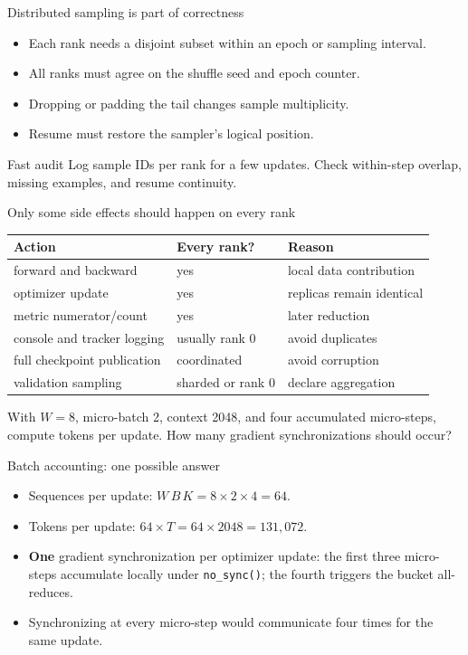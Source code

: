 \documentclass[handout]{beamer}
\begin{document}
\begin{frame}{Distributed sampling is part of correctness}
  \begin{itemize}
      \setlength{\itemsep}{8pt}
    \item Each rank needs a disjoint subset within an epoch or sampling interval.
    \item All ranks must agree on the shuffle seed and epoch counter.
    \item Dropping or padding the tail changes sample multiplicity.
    \item Resume must restore the sampler's logical position.
  \end{itemize}
  \begin{block}{Fast audit}
    Log sample IDs per rank for a few updates. Check within-step overlap, missing examples, and resume continuity.
  \end{block}
\end{frame}

\begin{frame}{Only some side effects should happen on every rank}
  \small
  \begin{tabular}{lll}
    \toprule
    Action & Every rank? & Reason \\
    \midrule
    forward and backward & yes & local data contribution \\
    optimizer update & yes & replicas remain identical \\
    metric numerator/count & yes & later reduction \\
    console and tracker logging & usually rank 0 & avoid duplicates \\
    full checkpoint publication & coordinated & avoid corruption \\
    validation sampling & sharded or rank 0 & declare aggregation \\
    \bottomrule
  \end{tabular}
\end{frame}

{With $W=8$, micro-batch 2, context 2048, and four accumulated micro-steps, compute tokens per update. How many gradient synchronizations should occur?}

\begin{frame}{Batch accounting: one possible answer}
  \begin{itemize}
      \setlength{\itemsep}{9pt}
    \item Sequences per update: $W\,B\,K=8\times2\times4=64$.
    \item Tokens per update: $64\times T=64\times2048=131{,}072$.
    \item \textbf{One} gradient synchronization per optimizer update: the first three micro-steps accumulate locally under \texttt{no\_sync()}; the fourth triggers the bucket all-reduces.
    \item Synchronizing at every micro-step would communicate four times for the same update.
  \end{itemize}
\end{frame}
\end{document}
